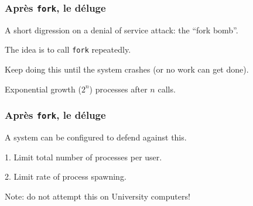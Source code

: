 \begin{frame}
\frametitle{Apr\`{e}s \texttt{fork}, le d\'{e}luge}

A short digression on a denial of service attack: the ``fork bomb''.

The idea is to call \texttt{fork} repeatedly.

Keep doing this until the system crashes (or no work can get done).

Exponential growth ($2^n$) processes after $n$ calls.

\end{frame}


\begin{frame}
\frametitle{Apr\`{e}s \texttt{fork}, le d\'{e}luge}
A system can be configured to defend against this.

1. Limit total number of processes per user.

2. Limit rate of process spawning.

Note: do not attempt this on University computers!

\end{frame}




